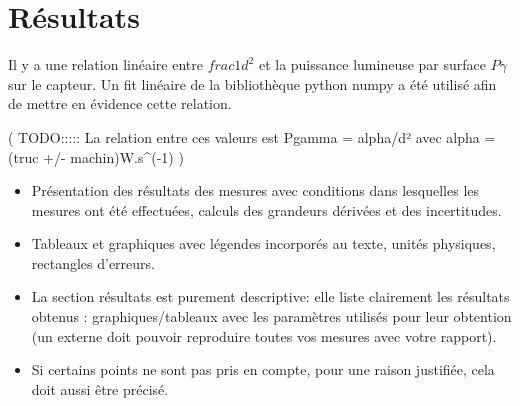\section{Résultats}

Il y a une relation linéaire entre \(frac{1}{d^2}\) et la puissance lumineuse par surface \(P\gamma\) sur le capteur. Un fit linéaire de la bibliothèque python numpy a été utilisé afin de mettre en évidence cette relation.

(  TODO:::::  La relation entre ces valeurs est Pgamma = alpha/d² avec alpha = (truc +/- machin)W.s^(-1)   )





\begin{itemize}
\item Présentation des résultats des mesures avec conditions dans lesquelles les mesures ont été effectuées, calculs des grandeurs dérivées et des incertitudes.
\item Tableaux et graphiques avec légendes incorporés au texte, unités physiques, rectangles d'erreurs.
\item La section résultats est purement descriptive: elle liste clairement les résultats obtenus : graphiques/tableaux avec les paramètres utilisés pour leur obtention (un externe doit pouvoir reproduire toutes vos mesures avec votre rapport).
\item Si certains points ne sont pas pris en compte, pour une raison justifiée, cela doit aussi être précisé.
\end{itemize}